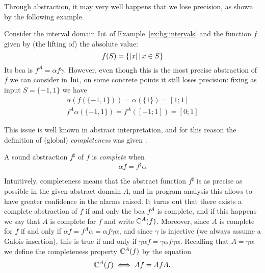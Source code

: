 Through abstraction, it may very well happens that we lose precision, as shown by the following example.
\begin{example}
	Consider the interval domain $\text{Int}$ of Example~\ref{ex:bg:intervals} and the function $f$ given by (the lifting of) the absolute value:
	\[
	f(S) = \{ \lvert x\rvert \,\vert\, x \in S \}
	\]
	Its bca is $f^{A} = \alpha f \gamma$. However, even though this is the most precise abstraction of $f$ we can consider in $\text{Int}$, on some concrete points it still loses precision: fixing as input $S = \{ -1, 1 \}$ we have
	\begin{align*}
		\alpha(f(\{ -1, 1 \})) = \alpha(\{ 1 \}) = [1; 1] \\
		f^{A} \alpha(\{ -1, 1\}) = f^{A}([-1; 1]) = [0; 1]
	\end{align*}
\end{example}
This issue is well known in abstract interpretation, and for this reason the definition of (global) \emph{completeness} was given \cite{CC79,GRS00}.
\begin{definition}
	A sound abstraction $f^{\sharp}$ of $f$ is \emph{complete} when
	\[
	\alpha f = f^{\sharp} \alpha
	\]
\end{definition}
Intuitively, completeness means that the abstract function $f^{\sharp}$ is as precise as possible in the given abstract domain $A$, and in program analysis this allows to have greater confidence in the alarms raised. It turns out that there exists a complete abstraction of $f$ if and only the bca $f^{A}$ is complete, and if this happens we say that $A$ is complete for $f$ and write $\mathbb{C}^{A}_{}(f)$. Moreover, since $A$ is complete for $f$ if and only if $\alpha f = f^{A} \alpha = \alpha f \gamma \alpha$, and since $\gamma$ is injective (we always assume a Galois insertion), this is true if and only if $\gamma \alpha f = \gamma \alpha f \gamma \alpha$. Recalling that $A = \gamma \alpha$ we define the completeness property $\mathbb{C}^{A}_{}(f)$ by the equation
\[
\mathbb{C}^{A}_{}(f) \iff A f = A f A .
\]

